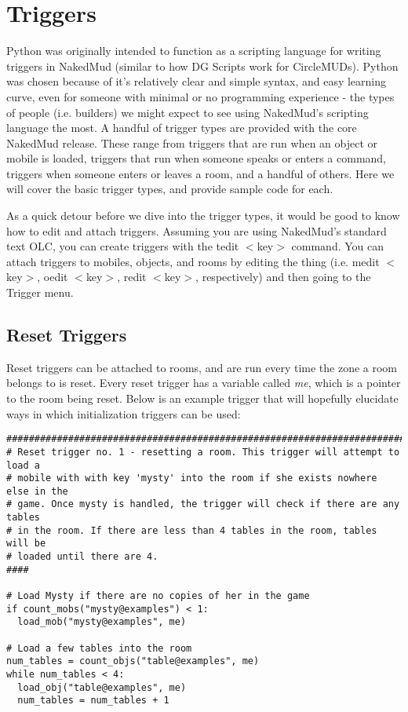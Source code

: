 \documentclass[12pt]{article}
\begin{document}
\newpage \section{Triggers}
Python was originally intended to function as a scripting language for writing triggers in NakedMud (similar to how DG Scripts work for CircleMUDs). Python was chosen because of it's relatively clear and simple syntax, and easy learning curve, even for someone with minimal or no programming experience - the types of people (i.e. builders) we might expect to see using NakedMud's scripting language the most. A handful of trigger types are provided with the core NakedMud release. These range from triggers that are run when an object or mobile is loaded, triggers that run when someone speaks or enters a command, triggers when someone enters or leaves a room, and a handful of others. Here we will cover the basic trigger types, and provide sample code for each.

As a quick detour before we dive into the trigger types, it would be good to know how to edit and attach triggers. Assuming you are using NakedMud's standard text OLC, you can create triggers with the tedit $<$key$>$ command. You can attach triggers to mobiles, objects, and rooms by editing the thing (i.e. medit $<$key$>$, oedit $<$key$>$, redit $<$key$>$, respectively) and then going to the Trigger menu.

\subsection{Reset Triggers}
Reset triggers can be attached to rooms, and are run every time the zone a room belongs to is reset. Every reset trigger has a variable called {\it me}, which is a pointer to the room being reset. Below is an example trigger that will hopefully elucidate ways in which initialization triggers can be used:

{\bf \begin{verbatim}
################################################################################
# Reset trigger no. 1 - resetting a room. This trigger will attempt to load a
# mobile with with key 'mysty' into the room if she exists nowhere else in the
# game. Once mysty is handled, the trigger will check if there are any tables
# in the room. If there are less than 4 tables in the room, tables will be
# loaded until there are 4.
####

# Load Mysty if there are no copies of her in the game
if count_mobs("mysty@examples") < 1:
  load_mob("mysty@examples", me)
  
# Load a few tables into the room
num_tables = count_objs("table@examples", me)
while num_tables < 4:
  load_obj("table@examples", me)
  num_tables = num_tables + 1
\end{verbatim}}
\end{document}
